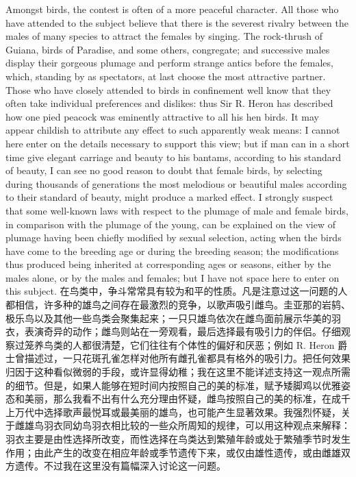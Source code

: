 \darwinpair
{Amongst birds, the contest is often of a more peaceful character. All those who have attended to the subject believe that there is the severest rivalry between the males of many species to attract the females by singing. The rock-thrush of Guiana, birds of Paradise, and some others, congregate; and successive males display their gorgeous plumage and perform strange antics before the females, which, standing by as spectators, at last choose the most attractive partner. Those who have closely attended to birds in confinement well know that they often take individual preferences and dislikes: thus Sir R. Heron has described how one pied peacock was eminently attractive to all his hen birds. It may appear childish to attribute any effect to such apparently weak means: I cannot here enter on the details necessary to support this view; but if man can in a short time give elegant carriage and beauty to his bantams, according to his standard of beauty, I can see no good reason to doubt that female birds, by selecting during thousands of generations the most melodious or beautiful males according to their standard of beauty, might produce a marked effect. I strongly suspect that some well-known laws with respect to the plumage of male and female birds, in comparison with the plumage of the young, can be explained on the view of plumage having been chiefly modified by sexual selection, acting when the birds have come to the breeding age or during the breeding season; the modifications thus produced being inherited at corresponding ages or seasons, either by the males alone, or by the males and females; but I have not space here to enter on this subject.}
{在鸟类中，争斗常常具有较为和平的性质。凡是注意过这一问题的人都相信，许多种的雄鸟之间存在最激烈的竞争，以歌声吸引雌鸟。圭亚那的岩鸫、极乐鸟以及其他一些鸟类会聚集起来；一只只雄鸟依次在雌鸟面前展示华美的羽衣，表演奇异的动作；雌鸟则站在一旁观看，最后选择最有吸引力的伴侣。仔细观察过笼养鸟类的人都很清楚，它们往往有个体性的偏好和厌恶；例如 R. Heron 爵士曾描述过，一只花斑孔雀怎样对他所有雌孔雀都具有格外的吸引力。把任何效果归因于这种看似微弱的手段，或许显得幼稚；我在这里不能详述支持这一观点所需的细节。但是，如果人能够在短时间内按照自己的美的标准，赋予矮脚鸡以优雅姿态和美丽，那么我看不出有什么充分理由怀疑，雌鸟按照自己的美的标准，在成千上万代中选择歌声最悦耳或最美丽的雄鸟，也可能产生显著效果。我强烈怀疑，关于雌雄鸟羽衣同幼鸟羽衣相比较的一些众所周知的规律，可以用这种观点来解释：羽衣主要是由性选择所改变，而性选择在鸟类达到繁殖年龄或处于繁殖季节时发生作用；由此产生的改变在相应年龄或季节遗传下来，或仅由雄性遗传，或由雌雄双方遗传。不过我在这里没有篇幅深入讨论这一问题。}

